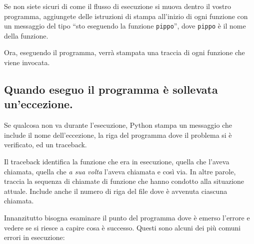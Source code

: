 \documentclass[10pt]{book}
\begin{document}
Se non siete sicuri di come il flusso di esecuzione si muova dentro il vostro programma, aggiungete delle istruzioni di stampa all'inizio di ogni funzione con un messaggio del tipo ``sto eseguendo la funzione {\tt pippo}'', dove
{\tt pippo} è il nome della funzione.

Ora, eseguendo il programma, verrà stampata una traccia di ogni funzione che viene invocata.


\subsection{Quando eseguo il programma è sollevata un'eccezione.}

Se qualcosa non va durante l'esecuzione, Python stampa un messaggio che include il nome dell'eccezione, la riga del programma dove il problema si è verificato, ed un traceback.

Il traceback identifica la funzione che era in esecuzione, quella che l'aveva chiamata, quella che {\em a sua volta} l'aveva chiamata e così via. In altre parole, traccia la sequenza di chiamate di funzione che hanno condotto alla situazione attuale. Include anche il numero di riga del file dove è avvenuta ciascuna chiamata.

Innanzitutto bisogna esaminare il punto del programma dove è emerso l'errore e vedere se si riesce a capire cosa è successo. Questi sono alcuni dei più comuni errori in esecuzione:
\end{document}
